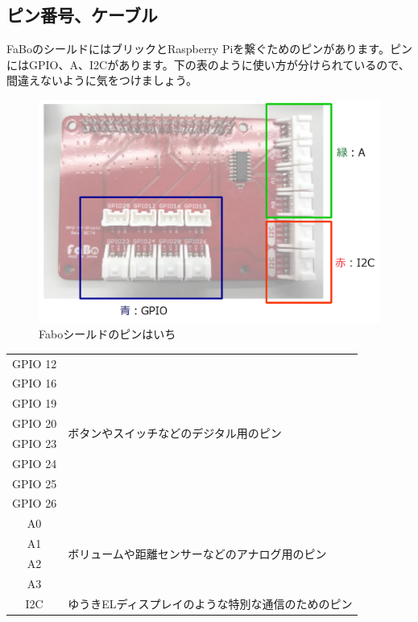 \subsection{ピン番号、ケーブル}
FaBoのシールドにはブリックとRaspberry Piを繋ぐためのピンがあります。ピンにはGPIO、A、I2Cがあります。下の表のように使い方が分けられているので、間違えないように気をつけましょう。\\
\begin{figure}[H]
\begin{center}
    \includegraphics[scale=0.6]{images/chap05/text05-img012.png}
    \caption{Faboシールドのピンはいち}
\end{center}
\end{figure}
\begin{table}[H]
 \centering
 \begin{tabular}{|c|l|} \hline
  GPIO 12 & \multirow{8}{*}{ボタンやスイッチなどのデジタル用のピン} \\ \cline{1-1}
  GPIO 16 & \\ \cline{1-1} GPIO 19 & \\ \cline{1-1} GPIO 20 & \\ \cline{1-1} GPIO 23 & \\ \cline{1-1}
  GPIO 24 & \\ \cline{1-1} GPIO 25 & \\ \cline{1-1} GPIO 26 & \\ \hline
  A0 & \multirow{4}{*}{ボリュームや距離センサーなどのアナログ用のピン} \\ \cline{1-1}
  A1 & \\ \cline{1-1} A2 & \\ \cline{1-1} A3 & \\ \hline
  I2C & ゆうきELディスプレイのような特別な通信のためのピン \\ \hline
 \end{tabular}
\end{table}
